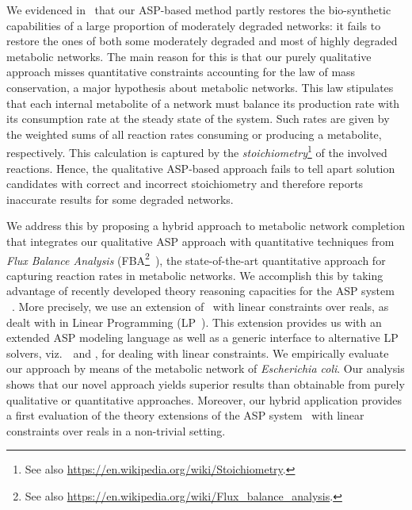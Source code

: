 We evidenced in~\citep{Prigent2017}
that our ASP-based method partly restores the bio-synthetic capabilities of a large proportion of moderately degraded networks: it fails to restore the ones of both some moderately degraded and most of highly degraded metabolic networks.
%
The main reason for this is that our purely qualitative approach misses quantitative constraints
accounting for the law of mass conservation,
a major hypothesis about metabolic networks.
%
This law stipulates that
each internal metabolite of a network must balance its production rate with its consumption rate at the steady state of the system.
Such rates are given by the weighted sums of all reaction rates consuming or producing a metabolite, respectively.
This calculation is captured by the \emph{stoichiometry}\footnote{See also \url{https://en.wikipedia.org/wiki/Stoichiometry}.} of the involved reactions.
%
Hence,
the qualitative ASP-based approach fails to tell apart solution candidates with correct and incorrect stoichiometry
and therefore reports inaccurate results for some degraded networks.

We address this by proposing a hybrid approach to metabolic network completion that integrates our qualitative ASP approach
with quantitative techniques from
\emph{Flux Balance Analysis} (FBA\footnote{See also \url{https://en.wikipedia.org/wiki/Flux_balance_analysis}.}~\citep{marzom16a}), %
the state-of-the-art quantitative approach for capturing reaction rates in metabolic networks.
%
We accomplish this by taking advantage of recently developed theory reasoning capacities for the ASP system \clingo~\citep{gekakaosscwa16a}.
More precisely,
we use an extension of \clingo\ with linear constraints over reals, as dealt with in Linear Programming (LP~\citep{dantzig63a}).
%
This extension provides us with an extended ASP modeling language as well as a generic interface to alternative LP solvers, viz.\ \cplex\ and \lpsolve,
for dealing with linear constraints.
%
We empirically evaluate our approach by means of the metabolic network of \emph{Escherichia coli}.
Our analysis shows that our novel approach yields superior results than obtainable from purely qualitative or quantitative approaches.
%
Moreover, our hybrid application provides a first evaluation of the theory extensions of the ASP system \clingo\
with linear constraints over reals in a non-trivial setting.
%


